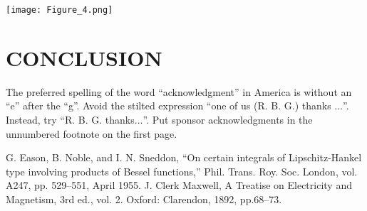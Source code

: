 \documentclass[conference]{IEEEtran}
\begin{document}
\texttt{[image: Figure\_4.png]}

\section*{CONCLUSION}

The preferred spelling of the word ``acknowledgment'' in America is without 
an ``e'' after the ``g''. Avoid the stilted expression ``one of us (R. B. 
G.) thanks $\ldots$''. Instead, try ``R. B. G. thanks$\ldots$''. Put sponsor 
acknowledgments in the unnumbered footnote on the first page.

\begin{thebibliography}{00}
 G. Eason, B. Noble, and I. N. Sneddon, ``On certain integrals of Lipschitz-Hankel type involving products of Bessel functions,'' Phil. Trans. Roy. Soc. London, vol. A247, pp. 529--551, April 1955.
 J. Clerk Maxwell, A Treatise on Electricity and Magnetism, 3rd ed., vol. 2. Oxford: Clarendon, 1892, pp.68--73.
\end{thebibliography}
\end{document}
